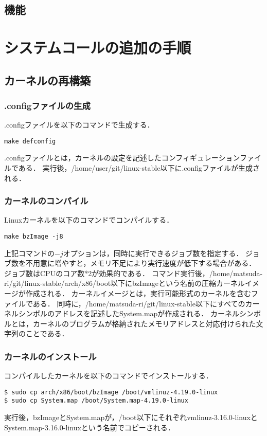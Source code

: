 \documentclass[12pt]{jsarticle}
\begin{document}
\subsection{機能}
\section{システムコールの追加の手順}
\subsection{カーネルの再構築}
\subsubsection{.configファイルの生成}
.configファイルを以下のコマンドで生成する．
\begin{verbatim}
make defconfig
\end{verbatim}
.configファイルとは，カーネルの設定を記述したコンフィギュレーションファイルである．
実行後，/home/user/git/linux-stable以下に.configファイルが生成される．

\subsubsection{カーネルのコンパイル}
Linuxカーネルを以下のコマンドでコンパイルする．
\begin{verbatim}
make bzImage -j8
\end{verbatim}
上記コマンドの$-j$オプションは，同時に実行できるジョブ数を指定する．
ジョブ数を不用意に増やすと，メモリ不足により実行速度が低下する場合がある．
ジョブ数はCPUのコア数*2が効果的である．
コマンド実行後，/home/matsuda-ri/git/linux-stable/arch/x86/boot以下にbzImageという名前の圧縮カーネルイメージが作成される．
カーネルイメージとは，実行可能形式のカーネルを含むファイルである．
同時に，/home/matsuda-ri/git/linux-stable以下にすべてのカーネルシンボルのアドレスを記述したSystem.mapが作成される．
カーネルシンボルとは，カーネルのプログラムが格納されたメモリアドレスと対応付けられた文字列のことである．

\subsubsection{カーネルのインストール}
コンパイルしたカーネルを以下のコマンドでインストールする．
\begin{verbatim}
$ sudo cp arch/x86/boot/bzImage /boot/vmlinuz-4.19.0-linux
$ sudo cp System.map /boot/System.map-4.19.0-linux
\end{verbatim}
実行後，bzImageとSystem.mapが，/boot以下にそれぞれvmlinuz-3.16.0-linuxとSystem.map-3.16.0-linuxという名前でコピーされる．
\end{document}
